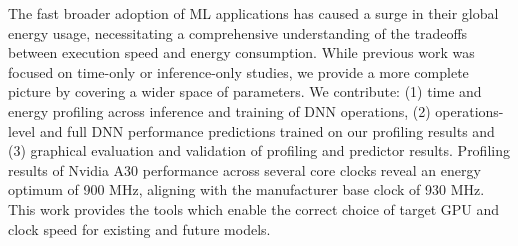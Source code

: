The fast broader adoption of ML applications has caused a surge in their global energy usage, necessitating a comprehensive understanding of the tradeoffs between execution speed and energy consumption. While previous work was focused on time-only or inference-only studies, we provide a more complete picture by covering a wider space of parameters. We contribute: (1) time and energy profiling across inference and training of DNN operations, (2) operations-level and full DNN performance predictions trained on our profiling results and (3) graphical evaluation and validation of profiling and predictor results. Profiling results of Nvidia A30 performance across several core clocks reveal an energy optimum of 900 MHz, aligning with the manufacturer base clock of 930 MHz. This work provides the tools which enable the correct choice of target GPU and clock speed for existing and future models.






\newpage


